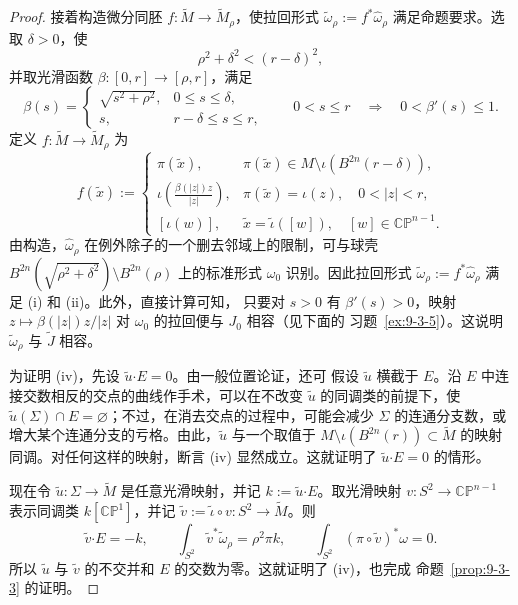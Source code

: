 \begin{proof}
接着构造微分同胚 $f:\widetilde M\to\widetilde M_\rho$，使拉回形式
$\widetilde\omega_\rho:=f^*\widehat\omega_\rho$ 满足命题要求。选取 $\delta>0$，使
\[
  \rho^2+\delta^2<(r-\delta)^2,
\]
并取光滑函数 $\beta:[0,r]\to[\rho,r]$，满足
\[
  \beta(s)=
  \begin{cases}
    \sqrt{s^2+\rho^2},&0\le s\le\delta,\\
    s,&r-\delta\le s\le r,
  \end{cases}
  \qquad
  0<s\le r\quad\Longrightarrow\quad0<\beta'(s)\le1.
\]
定义 $f:\widetilde M\to\widetilde M_\rho$ 为
\[
  f(\widetilde x):=
  \begin{cases}
    \pi(\widetilde x),
      &\pi(\widetilde x)\in M\setminus\iota(B^{2n}(r-\delta)),\\[2pt]
    \displaystyle\iota\left(\frac{\beta(|z|)z}{|z|}\right),
      &\pi(\widetilde x)=\iota(z),\quad0<|z|<r,\\[6pt]
    [\iota(w)],
      &\widetilde x=\widetilde\iota([w]),\quad[w]\in\mathbb{CP}^{n-1}.
  \end{cases}
\]
由构造，$\widehat\omega_\rho$ 在例外除子的一个删去邻域上的限制，可与球壳
$B^{2n}(\sqrt{\rho^2+\delta^2})\setminus B^{2n}(\rho)$ 上的标准形式
$\omega_0$ 识别。因此拉回形式
$\widetilde\omega_\rho:=f^*\widehat\omega_\rho$ 满足 (i) 和 (ii)。此外，直接计算可知，
只要对 $s>0$ 有 $\beta'(s)>0$，映射
$z\mapsto\beta(|z|)z/|z|$ 对 $\omega_0$ 的拉回便与 $J_0$ 相容（见下面的
习题~\ref{ex:9-3-5}）。这说明 $\widetilde\omega_\rho$ 与 $\widetilde J$ 相容。

为证明 (iv)，先设 $\widetilde u\mathbin{\boldsymbol\cdot}E=0$。由一般位置论证，还可
假设 $\widetilde u$ 横截于 $E$。沿 $E$ 中连接交数相反的交点的曲线作手术，可以在不改变
$\widetilde u$ 的同调类的前提下，使
$\widetilde u(\Sigma)\cap E=\varnothing$；不过，在消去交点的过程中，可能会减少
$\Sigma$ 的连通分支数，或增大某个连通分支的亏格。由此，$\widetilde u$ 与一个取值于
$M\setminus\iota(B^{2n}(r))\subset\widetilde M$ 的映射同调。对任何这样的映射，断言
(iv) 显然成立。这就证明了
$\widetilde u\mathbin{\boldsymbol\cdot}E=0$ 的情形。

现在令 $\widetilde u:\Sigma\to\widetilde M$ 是任意光滑映射，并记
$k:=\widetilde u\mathbin{\boldsymbol\cdot}E$。取光滑映射
$v:S^2\to\mathbb{CP}^{n-1}$ 表示同调类 $k[\mathbb{CP}^1]$，并记
$\widetilde v:=\widetilde\iota\circ v:S^2\to\widetilde M$。则
\[
  \widetilde v\mathbin{\boldsymbol\cdot}E=-k,
  \qquad
  \int_{S^2}\widetilde v^*\widetilde\omega_\rho=\rho^2\pi k,
  \qquad
  \int_{S^2}(\pi\circ\widetilde v)^*\omega=0.
\]
所以 $\widetilde u$ 与 $\widetilde v$ 的不交并和 $E$ 的交数为零。这就证明了 (iv)，也完成
命题~\ref{prop:9-3-3} 的证明。
\end{proof}

